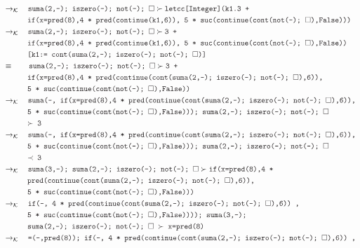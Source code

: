 \documentclass{article}
\newcommand{\tx}[1]{\textcolor{Black} {\texttt{#1}}}
\newcommand{\es}{$\square$}
\newcommand{\pop}[2]{ \tx{#1} \succ \tx{#2}}
\newcommand{\kr}{\rightarrow_{\mathcal{K}} \quad}
\begin{document}
\begin{enumerate}
\begin{enumerate}
\begin{align*}
			&\kr \pop{suma(2,-); iszero(-); not(-); \es}{letcc[Integer](k1.3 +}\\
			&\tx{\quad \quad \quad if(x=pred(8),4 * pred(continue(k1,6)), 5 * suc(continue(cont(not(-); \es),False)))}\\
			&\kr \pop{suma(2,-); iszero(-); not(-); \es}{3 +}\\
			&\tx{\quad \quad \quad if(x=pred(8),4 * pred(continue(k1,6)), 5 * suc(continue(cont(not(-); \es),False))}\\
			&\tx{\quad \quad \quad [k1:= cont(suma(2,-); iszero(-); not(-); \es)]}\\
			& \equiv \quad \quad \pop{suma(2,-); iszero(-); not(-); \es}{3 +}\\
			&\tx{\quad \quad \quad if(x=pred(8),4 * pred(continue(cont(suma(2,-); iszero(-); not(-); \es),6)),}\\
			&\tx{\quad \quad \quad 5 * suc(continue(cont(not(-); \es),False))}\\
			& \kr \tx{suma(-, if(x=pred(8),4 * pred(continue(cont(suma(2,-); iszero(-); not(-); \es),6)),}\\
			&\tx{\quad \quad \quad5 * suc(continue(cont(not(-); \es),False))); suma(2,-); iszero(-); not(-); \es}\\
			&\tx{\quad \quad \quad $\succ$ 3}\\
			& \kr \tx{suma(-, if(x=pred(8),4 * pred(continue(cont(suma(2,-); iszero(-); not(-); \es),6)),}\\
			&\tx{\quad \quad \quad 5 * suc(continue(cont(not(-); \es),False))); suma(2,-); iszero(-); not(-); \es}\\
			&\tx{\quad \quad \quad $\prec$ 3}\\
			&\kr \pop{suma(3,-); suma(2,-); iszero(-); not(-); \es}{if(x=pred(8),4 *}\\
			&\tx{\quad \quad \quad pred(continue(cont(suma(2,-); iszero(-); not(-); \es),6)),}\\
			&\tx{\quad \quad \quad 5 * suc(continue(cont(not(-); \es),False)))}\\
			&\kr \tx{if(-, 4 * pred(continue(cont(suma(2,-); iszero(-); not(-); \es),6)) ,}\\
			&\tx {\quad \quad \quad 5 * suc(continue(cont(not(-); \es),False)))); suma(3,-);}\\
			&\tx{\quad \quad \quad suma(2,-); iszero(-); not(-); \es $\ \succ $ x=pred(8)}\\
			&\kr \tx{=(-,pred(8)); if(-, 4 * pred(continue(cont(suma(2,-); iszero(-); not(-); \es),6)) ,}\\

\end{align*}
\end{enumerate}
\end{enumerate}
\end{document}
